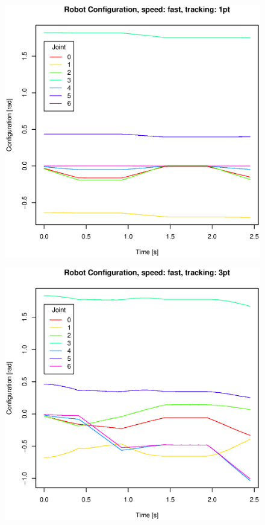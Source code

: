 \begin{figure}[H]
\centering
\includegraphics[width= \linewidth]{graphics/robotics/robotConfiguration_fast_1pt}
\caption{}
\label{fig:}
\end{figure}

\begin{figure}[H]
\centering
\includegraphics[width= \linewidth]{graphics/robotics/robotConfiguration_fast_3pt}
\caption{}
\label{fig:}
\end{figure}


